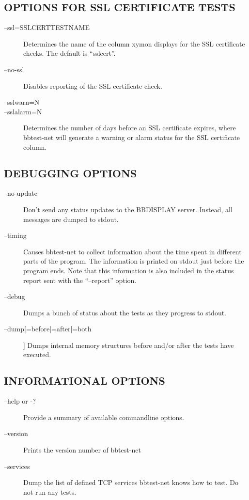 \subsection{OPTIONS FOR SSL CERTIFICATE TESTS}
\begin{description}
\item[--ssl=SSLCERTTESTNAME] Determines the name of the column xymon
  displays for the SSL certificate checks. The default is
  ``sslcert''. 

\item[--no-ssl] Disables reporting of the SSL certificate check. 

 

\item[--sslwarn=N]
\item[--sslalarm=N] Determines the number of days before an SSL
  certificate expires, where bbtest-net will generate a warning or
  alarm status for the SSL certificate column. 



\end{description}
\subsection{DEBUGGING OPTIONS}
\begin{description}
\item[--no-update] Don't send any status updates to the BBDISPLAY
  server. Instead, all messages are dumped to stdout. 



\item[--timing] Causes bbtest-net to collect information about the
  time spent in different parts of the program. The information is
  printed on stdout just before the program ends. Note that this
  information is also included in the status report sent with the
  ``--report'' option. 


\item[--debug] Dumps a bunch of status about the tests as they progress to stdout. 

 

\item[--dump[=before|=after|=both]] Dumps internal memory structures
  before and/or after the tests have executed. 


 
\end{description}
\subsection{INFORMATIONAL OPTIONS}
\begin{description}
\item[--help or -?] Provide a summary of available commandline options. 

 

\item[--version] Prints the version number of bbtest-net 

 

\item[--services] Dump the list of defined TCP services bbtest-net
  knows how to test. Do not run any tests. 



\end{description}
